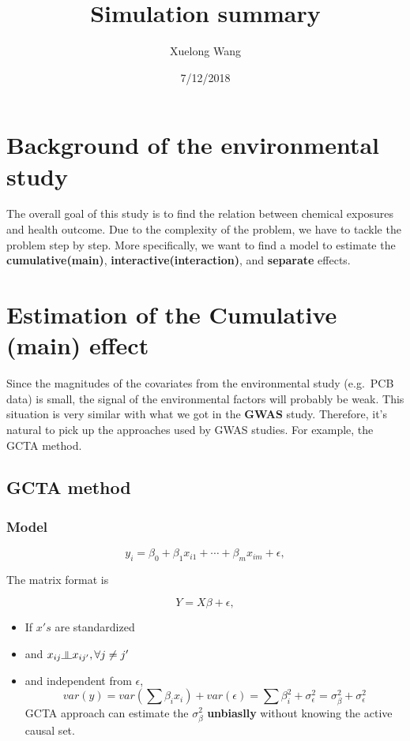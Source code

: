 \documentclass[]{article}
\title{Simulation summary}
\author{Xuelong Wang}
\date{7/12/2018}
\providecommand{\tightlist}{%
  \setlength{\itemsep}{0pt}\setlength{\parskip}{0pt}}
\newcommand{\indep}{\rotatebox[origin=c]{90}{$\models$}}
\begin{document}
\maketitle

{
\setcounter{tocdepth}{2}
\tableofcontents
}
\section{Background of the environmental
study}\label{background-of-the-environmental-study}

The overall goal of this study is to find the relation between chemical
exposures and health outcome. Due to the complexity of the problem, we
have to tackle the problem step by step. More specifically, we want to
find a model to estimate the \textbf{cumulative(main)},
\textbf{interactive(interaction)}, and \textbf{separate} effects.

\section{Estimation of the Cumulative (main)
effect}\label{estimation-of-the-cumulative-main-effect}

Since the magnitudes of the covariates from the environmental study
(e.g.~PCB data) is small, the signal of the environmental factors will
probably be weak. This situation is very similar with what we got in the
\textbf{GWAS} study. Therefore, it's natural to pick up the approaches
used by GWAS studies. For example, the GCTA method.

\subsection{GCTA method}\label{gcta-method}

\subsubsection{Model}\label{model}

\[
  y_i = \beta_0 + \beta_{1}x_{i1}+\cdots+\beta_{m}x_{im} + \epsilon,    
\]

The matrix format is

\[
  Y = X\beta + \epsilon,    
\]

\begin{itemize}
\tightlist
\item
  If \(x's\) are standardized
\item
  and \(x_{ij} \indep x_{ij'}, \forall j \neq j'\)
\item
  and independent from \(\epsilon\), \[
    var(y) = var(\sum\beta_ix_i) + var(\epsilon) = \sum\beta^2_i + \sigma^2_{\epsilon} = \sigma^2_{\beta} + \sigma^2_{\epsilon}
  \] GCTA approach can estimate the \(\sigma^2_\beta\)
  \textbf{unbiaslly} without knowing the active causal set.
\end{itemize}
\end{document}
